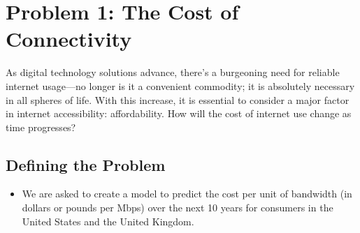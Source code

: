\documentclass[12pt]{article}
\begin{document}
\pagebreak
{\small\tableofcontents}
\pagebreak

\section{Problem 1: The Cost of Connectivity}

As digital technology solutions advance, there’s a burgeoning need for reliable internet usage—no longer is it a convenient commodity; it is absolutely necessary in all spheres of life. With this increase, it is essential to consider a major factor in internet accessibility: affordability. How will the cost of internet use change as time progresses? 

\subsection{Defining the Problem}

\begin{itemize}
    \item We are asked to create a model to predict the cost per unit of bandwidth (in dollars or pounds per Mbps) over the next 10 years for consumers in the United States and the United Kingdom.
\end{itemize}
\end{document}
